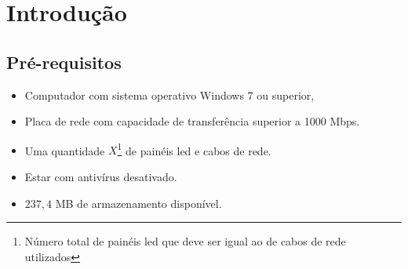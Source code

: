 \documentclass[12pt, a4paper]{article}
\begin{document}
\section{Introdução}\label{Introdução}
\subsection{Pré-requisitos}\label{Pré-requisitos}
\begin{itemize}
	\item Computador com sistema operativo Windows 7 ou superior,	
	\item Placa de rede com capacidade de transferência superior a 1000 Mbps.
	\item Uma quantidade $X$\footnote{Número total de painéis led que deve ser igual ao de cabos de rede utilizados} de painéis led e cabos de rede.
	\item Estar com antivírus desativado.
	\item $237,4$ MB de armazenamento disponível.
\end{itemize}

\newpage
\end{document}
